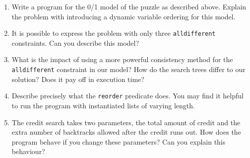 \begin{enumerate}
\item Write a program for the 0/1 model of the puzzle as described above. Explain the problem with introducing a dynamic variable ordering for this model.
\item It is possible to express the problem with only three \texttt{alldifferent} constraints. Can you describe this model?
\item What is the impact of using a more powerful consistency method for the \texttt{alldifferent} constraint in our model? How do the search trees differ to our solution? Does it pay off in execution time?
\item Describe precisely what the \texttt{reorder} predicate does. You may find it helpful to run the program with instantiated lists of varying length. 
\item The credit search takes two parameters, the total amount of credit and the extra number of backtracks allowed after the credit runs out. How does the program behave if you change these parameters? Can you explain this behaviour?
\end{enumerate}
